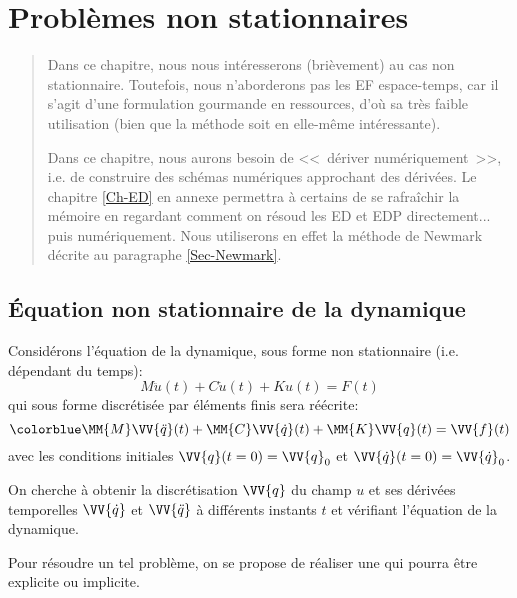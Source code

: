 \chapter{Problèmes non stationnaires}\label{Ch-temps}
\begin{abstract}
Dans ce chapitre, nous nous intéresserons (brièvement) au cas non stationnaire.
Toutefois, nous n'aborderons pas les EF espace-temps, car il s'agit d'une formulation
gourmande en ressources, d'où sa très faible utilisation (bien que la méthode
soit en elle-même intéressante).

Dans ce chapitre, nous aurons besoin de <<~dériver numériquement~>>, i.e. de
construire des schémas numériques approchant des dérivées.
Le chapitre \ref{Ch-ED} en annexe permettra à certains de se rafraîchir la mémoire
en regardant comment on résoud les ED et EDP directement... puis numériquement.
Nous utiliserons en effet la méthode de Newmark
 décrite au paragraphe \ref{Sec-Newmark}.
\end{abstract}

\medskip
\section{Équation non stationnaire de la dynamique}
Considérons l'équation de la dynamique, sous forme non stationnaire (i.e. dépendant du temps):
\begin{equation} M \ddot u(t) + C \dot u(t) + K u(t)= F(t) \end{equation}
qui sous forme discrétisée par éléments finis sera réécrite:
\begin{equation}\colorblue \MM{M}\VV{\ddot q}(t) +  \MM{C}\VV{\dot q}(t) + \MM{K}\VV{q}(t)= \VV{f}(t) \end{equation}
avec les conditions initiales $\VV{q}(t=0)=\VV{q}_0$ et $\VV{\dot q}(t=0)=\VV{\dot q}_0$.

\medskip
On cherche à obtenir la discrétisation $\VV{q}$ du champ $u$ et ses dérivées
temporelles $\VV{\dot q}$ et $\VV{\ddot q}$ à différents instants $t$ et vérifiant l'équation de la dynamique.

\medskip
Pour résoudre un tel problème, on se propose de réaliser une  qui pourra être explicite ou implicite.

